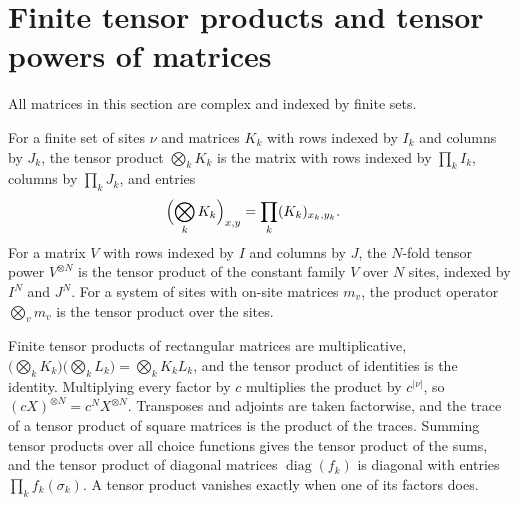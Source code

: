 \section{Finite tensor products and tensor powers of matrices}

All matrices in this section are complex and indexed by finite sets.

\begin{definition}
    \label{def:elementary_finite_tensor_product}
    \leanok
    For a finite set of sites $\nu$ and matrices $K_k$ with rows indexed by
    $I_k$ and columns by $J_k$, the tensor product $\bigotimes_kK_k$ is the
    matrix with rows indexed by $\prod_kI_k$, columns by $\prod_kJ_k$, and
    entries
    \begin{align}
        \Bigl(\bigotimes_kK_k\Bigr)_{x,y}
         & =\prod_k(K_k)_{x_k,y_k}.
        \notag
    \end{align}
    For a matrix $V$ with rows indexed by $I$ and columns by $J$, the
    $N$-fold tensor power $V^{\otimes N}$ is the tensor product of the
    constant family $V$ over $N$ sites, indexed by $I^N$ and $J^N$. For a
    system of sites with on-site matrices $m_v$, the product operator
    $\bigotimes_vm_v$ is the tensor product over the sites.
\end{definition}

\begin{lemma}
    \label{lem:elementary_finite_tensor_product_algebra}
    \leanok
    Finite tensor products of rectangular matrices are multiplicative,
    $\bigl(\bigotimes_kK_k\bigr)\bigl(\bigotimes_kL_k\bigr)
        =\bigotimes_kK_kL_k$, and the tensor product of identities is the
    identity. Multiplying every factor by $c$ multiplies the product by
    $c^{\lvert\nu\rvert}$, so $(cX)^{\otimes N}=c^NX^{\otimes N}$. Transposes
    and adjoints are taken factorwise, and the trace of a tensor product of
    square matrices is the product of the traces. Summing tensor products over
    all choice functions gives the tensor product of the sums, and the tensor
    product of diagonal matrices $\operatorname{diag}(f_k)$ is diagonal with
    entries $\prod_kf_k(\sigma_k)$. A tensor product vanishes exactly when one
    of its factors does.
\end{lemma}


